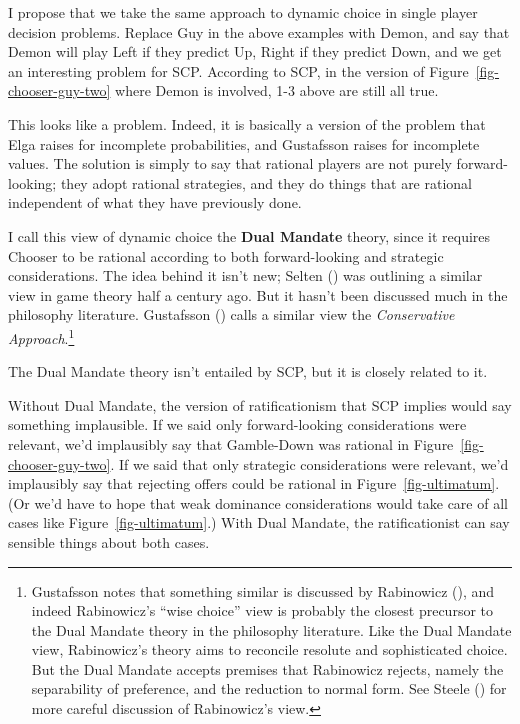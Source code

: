 \documentclass[
  10pt,
  letterpaper,
  DIV=11,
  numbers=noendperiod,
  twoside]{scrartcl}
\begin{document}
I propose that we take the same approach to dynamic choice in single
player decision problems. Replace Guy in the above examples with Demon,
and say that Demon will play Left if they predict Up, Right if they
predict Down, and we get an interesting problem for SCP. According to
SCP, in the version of Figure~\ref{fig-chooser-guy-two} where Demon is
involved, 1-3 above are still all true.

This looks like a problem. Indeed, it is basically a version of the
problem that Elga raises for incomplete probabilities, and Gustafsson
raises for incomplete values. The solution is simply to say that
rational players are not purely forward-looking; they adopt rational
strategies, and they do things that are rational independent of what
they have previously done.

I call this view of dynamic choice the \textbf{Dual Mandate} theory,
since it requires Chooser to be rational according to both
forward-looking and strategic considerations. The idea behind it isn't
new; Selten () was outlining a similar
view in game theory half a century ago. But it hasn't been discussed
much in the philosophy literature. Gustafsson
() calls a similar view the
\emph{Conservative Approach}.\footnote{Gustafsson notes that something
  similar is discussed by Rabinowicz
  (), and indeed Rabinowicz's ``wise
  choice'' view is probably the closest precursor to the Dual Mandate
  theory in the philosophy literature. Like the Dual Mandate view,
  Rabinowicz's theory aims to reconcile resolute and sophisticated
  choice. But the Dual Mandate accepts premises that Rabinowicz rejects,
  namely the separability of preference, and the reduction to normal
  form. See Steele () for more careful
  discussion of Rabinowicz's view.}

The Dual Mandate theory isn't entailed by SCP, but it is closely related
to it.

Without Dual Mandate, the version of ratificationism that SCP implies
would say something implausible. If we said only forward-looking
considerations were relevant, we'd implausibly say that Gamble-Down was
rational in Figure~\ref{fig-chooser-guy-two}. If we said that only
strategic considerations were relevant, we'd implausibly say that
rejecting offers could be rational in Figure~\ref{fig-ultimatum}. (Or
we'd have to hope that weak dominance considerations would take care of
all cases like Figure~\ref{fig-ultimatum}.) With Dual Mandate, the
ratificationist can say sensible things about both cases.
\end{document}
